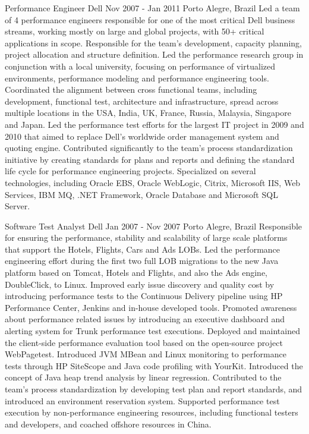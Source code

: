 \documentclass[]{mspier-cv}
\begin{document}
\experienceitem
  {Performance Engineer}
  {Dell}
  {Nov 2007 - Jan 2011}
  {Porto Alegre, Brazil}
  {
    Led a team of 4 performance engineers responsible for one of the most critical Dell business streams, working mostly on large and global projects, with 50+ critical applications in scope.
    Responsible for the team’s development, capacity planning, project allocation and structure definition.
    Led the performance research group in conjunction with a local university, focusing on performance of virtualized environments, performance modeling and performance engineering tools.
    Coordinated the alignment between cross functional teams, including development, functional test, architecture and infrastructure, spread across multiple locations  in the USA, India, UK, France, Russia, Malaysia, Singapore and Japan.
    Led the performance test efforts for the largest IT project in 2009 and 2010 that aimed to replace Dell’s worldwide order management system and quoting engine.
    Contributed significantly to the team’s process standardization initiative by creating standards for plans and reports and defining the standard life cycle for performance engineering projects.
    Specialized on several technologies, including Oracle EBS, Oracle WebLogic, Citrix, Microsoft IIS, Web Services, IBM MQ, .NET Framework, Oracle Database and Microsoft SQL Server.
  }

\experienceitem
  {Software Test Analyst}
  {Dell}
  {Jan 2007 - Nov 2007}
  {Porto Alegre, Brazil}
  {
    Responsible for ensuring the performance, stability and scalability of large scale platforms that support the Hotels, Flights, Cars and Ads LOBs.
    Led the performance engineering effort during the first two full LOB migrations to the new Java platform based on Tomcat, Hotels and Flights, and also the Ads engine, DoubleClick, to Linux.
    Improved early issue discovery and quality cost by introducing performance tests to the Continuous Delivery pipeline using HP Performance Center, Jenkins and in-house developed tools.
    Promoted awareness about performance related issues by introducing an executive dashboard and alerting system for Trunk performance test executions.
    Deployed and maintained the client-side performance evaluation tool based on the open-source project WebPagetest.
    Introduced JVM MBean and Linux monitoring to performance tests through HP SiteScope and Java code profiling with YourKit.
    Introduced the concept of Java heap trend analysis by linear regression.
    Contributed to the team’s process standardization by developing test plan and report standards, and introduced an environment reservation system.
    Supported performance test execution by non-performance engineering resources, including functional testers and developers, and coached offshore resources in China.
  }
\end{document}

